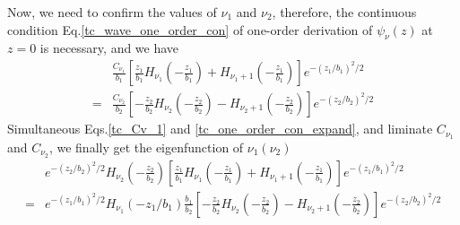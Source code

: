 Now, we need to confirm the values of $\nu_1$ and $\nu_2$, therefore, the continuous condition Eq.\eqref{tc_wave_one_order_con} of one-order derivation of $\psi_\nu(z)$ at $z = 0$ is necessary, and we have
\begin{equation}
\begin{aligned}
  & \frac{C_{\nu_{1}}}{b_{1}}\left[\frac{z_{1}}{b_{1}} H_{\nu_{1}}\left(-\frac{z_{1}}{b_{1}}\right)+H_{\nu_{1}+1}\left(-\frac{z_{1}}{b_{1}}\right)\right] e^{-\left(z_{1} / b_{1}\right)^{2} / 2} \\
  =& \frac{C_{\nu_{2}}}{b_{2}}\left[-\frac{z_{2}}{b_{2}} H_{\nu_{2}}\left(-\frac{z_{2}}{b_{2}}\right)-H_{\nu_{2}+1}\left(-\frac{z_{2}}{b_{2}}\right)\right] e^{-\left(z_{2} / b_{2}\right)^{2} / 2}   \label{tc_one_order_con_expand}
\end{aligned}
\end{equation}
Simultaneous Eqs.\eqref{tc_Cv_1} and \eqref{tc_one_order_con_expand}, and liminate $C_{\nu_1}$ and $C_{\nu_2}$, we finally get the eigenfunction of $\nu_1(\nu_2)$
\begin{equation}
\begin{aligned}
  & e^{-\left(z_{2} / b_{2}\right)^{2} / 2} H_{\nu_{2}}\left(-\frac{z_{2}}{b_{2}}\right)\left[\frac{z_{1}}{b_{1}} H_{\nu_{1}}\left(-\frac{z_{1}}{b_{1}}\right)+H_{\nu_{1}+1}\left(-\frac{z_{1}}{b_{1}}\right)\right] e^{-\left(z_{1} / b_{1}\right)^{2} / 2} \\
  =& e^{-\left(z_{1} / b_{1}\right)^{2} / 2} H_{\nu_{1}}\left(-z_{1} / b_{1}\right) \frac{b_{1}}{b_{2}}\left[-\frac{z_{2}}{b_{2}} H_{\nu_{2}}\left(-\frac{z_{2}}{b_{2}}\right)-H_{\nu_{2}+1}\left(-\frac{z_{2}}{b_{2}}\right)\right] e^{-\left(z_{2} / b_{2}\right)^{2} / 2}  \label{tc_eigen_func_Cv}
\end{aligned}
\end{equation}
